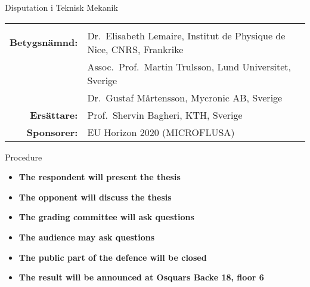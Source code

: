 \begin{frame}[plain]{Disputation i Teknisk Mekanik}
\begin{longtable}[]{@{}rl@{}}
\begin{minipage}[t]{0.72\columnwidth}
  \end{minipage}\tabularnewline
  \begin{minipage}[t]{0.22\columnwidth}\raggedleft
    \textbf{Betygsnämnd:}\strut
  \end{minipage} & \begin{minipage}[t]{0.72\columnwidth}\raggedright
    Dr.~Elisabeth Lemaire, Institut de Physique de Nice, CNRS, Frankrike\strut
  \end{minipage}\tabularnewline
  \begin{minipage}[t]{0.22\columnwidth}\raggedleft
    \strut
  \end{minipage} & \begin{minipage}[t]{0.72\columnwidth}\raggedright
    Assoc.~Prof.~Martin Trulsson, Lund Universitet, Sverige\strut
  \end{minipage}\tabularnewline
  \begin{minipage}[t]{0.22\columnwidth}\raggedleft
    \strut
  \end{minipage} & \begin{minipage}[t]{0.72\columnwidth}\raggedright
    Dr.~Gustaf M\aa rtensson, Mycronic AB, Sverige\strut
  \end{minipage}\tabularnewline
  \begin{minipage}[t]{0.22\columnwidth}\raggedleft
    \textbf{Ersättare:}\strut
  \end{minipage} & \begin{minipage}[t]{0.72\columnwidth}\raggedright
    Prof.~Shervin Bagheri, KTH, Sverige\strut
  \end{minipage}\tabularnewline
  \begin{minipage}[t]{0.22\columnwidth}\raggedleft
    \textbf{Sponsorer:}\strut
  \end{minipage} & \begin{minipage}[t]{0.72\columnwidth}\raggedright
    EU Horizon 2020 (MICROFLUSA)\strut
  \end{minipage}\tabularnewline
  \bottomrule
\end{longtable}
\end{frame}

\begin{frame}[plain]{Procedure}
\protect\hypertarget{procedure}{}
\begin{itemize}
\item
  \textbf{The respondent will present the thesis}
  \medskip
\item
  \textbf{The opponent will discuss the thesis}
  \medskip
\item
  \textbf{The grading committee will ask questions}
  \medskip
\item
  \textbf{The audience may ask questions}
  \medskip
\item
  \textbf{The public part of the defence will be closed}
  \medskip
\item
  \textbf{The result will be announced at Osquars Backe 18, floor 6}
\end{itemize}
\end{frame}
